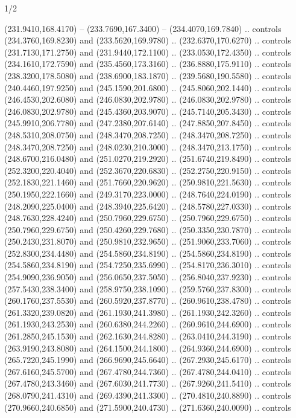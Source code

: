 \begin{flagdescription}{1/2}
\begin{scope}[xshift=0.5\flaglength]
\begin{scope}[scale=0.004\flagwidth,xshift=-90mm,yshift=89mm]
\begin{scope}[y=0.80pt, x=0.80pt, yscale=-1, xscale=1, inner sep=0pt, outer sep=0pt]
  (231.9410,168.4170) -- (233.7690,167.3400) -- (234.4070,169.7840) .. controls
  (234.3760,169.8230) and (233.5620,169.9780) .. (232.6370,170.6270) .. controls
  (231.7130,171.2750) and (231.9440,172.1100) .. (233.0530,172.4350) .. controls
  (234.1610,172.7590) and (235.4560,173.3160) .. (236.8880,175.9110) .. controls
  (238.3200,178.5080) and (238.6900,183.1870) .. (239.5680,190.5580) .. controls
  (240.4460,197.9250) and (245.1590,201.6800) .. (245.8060,202.1440) .. controls
  (246.4530,202.6080) and (246.0830,202.9780) .. (246.0830,202.9780) .. controls
  (246.0830,202.9780) and (245.4360,203.9070) .. (245.7140,205.3430) .. controls
  (245.9910,206.7780) and (247.2380,207.6140) .. (247.8850,207.8450) .. controls
  (248.5310,208.0750) and (248.3470,208.7250) .. (248.3470,208.7250) .. controls
  (248.3470,208.7250) and (248.0230,210.3000) .. (248.3470,213.1750) .. controls
  (248.6700,216.0480) and (251.0270,219.2920) .. (251.6740,219.8490) .. controls
  (252.3200,220.4040) and (252.3670,220.6830) .. (252.2750,220.9150) .. controls
  (252.1830,221.1460) and (251.7660,220.9620) .. (250.9810,221.5630) .. controls
  (250.1950,222.1660) and (249.3170,223.0000) .. (248.7640,224.0190) .. controls
  (248.2090,225.0400) and (248.3940,225.6420) .. (248.5780,227.0330) .. controls
  (248.7630,228.4240) and (250.7960,229.6750) .. (250.7960,229.6750) .. controls
  (250.7960,229.6750) and (250.4260,229.7680) .. (250.3350,230.7870) .. controls
  (250.2430,231.8070) and (250.9810,232.9650) .. (251.9060,233.7060) .. controls
  (252.8300,234.4480) and (254.5860,234.8190) .. (254.5860,234.8190) .. controls
  (254.5860,234.8190) and (254.7250,235.6990) .. (254.8170,236.3010) .. controls
  (254.9090,236.9050) and (256.0650,237.5050) .. (256.8040,237.9230) .. controls
  (257.5430,238.3400) and (258.9750,238.1090) .. (259.5760,237.8300) .. controls
  (260.1760,237.5530) and (260.5920,237.8770) .. (260.9610,238.4780) .. controls
  (261.3320,239.0820) and (261.1930,241.3980) .. (261.1930,242.3260) .. controls
  (261.1930,243.2530) and (260.6380,244.2260) .. (260.9610,244.6900) .. controls
  (261.2850,245.1530) and (262.1630,244.8280) .. (263.0410,244.3190) .. controls
  (263.9190,243.8080) and (264.1500,244.1800) .. (264.9360,244.6900) .. controls
  (265.7220,245.1990) and (266.9690,245.6640) .. (267.2930,245.6170) .. controls
  (267.6160,245.5700) and (267.4780,244.7360) .. (267.4780,244.0410) .. controls
  (267.4780,243.3460) and (267.6030,241.7730) .. (267.9260,241.5410) .. controls
  (268.0790,241.4310) and (269.4390,241.3300) .. (270.4810,240.8890) .. controls
  (270.9660,240.6850) and (271.5900,240.4730) .. (271.6360,240.0090) .. controls

\end{scope}
\end{scope}
\end{scope}
\end{flagdescription}
